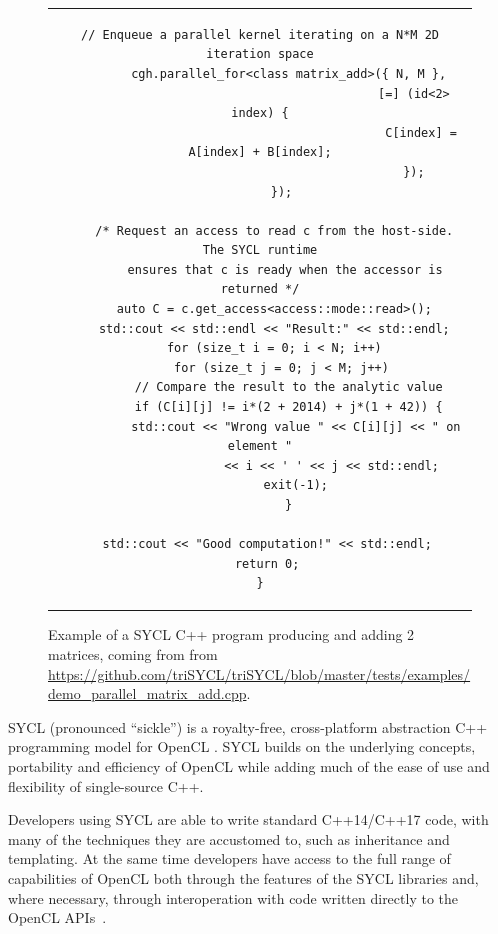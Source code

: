 \documentclass[sigplan, review]{acmart}
\begin{document}
\begin{figure}
\begin{tabular}{c}
\begin{lstlisting}[basicstyle=\scriptsize]
        // Enqueue a parallel kernel iterating on a N*M 2D iteration space
        cgh.parallel_for<class matrix_add>({ N, M },
                                           [=] (id<2> index) {
                                             C[index] = A[index] + B[index];
                                           });
      });

    /* Request an access to read c from the host-side. The SYCL runtime
       ensures that c is ready when the accessor is returned */
    auto C = c.get_access<access::mode::read>();
    std::cout << std::endl << "Result:" << std::endl;
    for (size_t i = 0; i < N; i++)
      for (size_t j = 0; j < M; j++)
        // Compare the result to the analytic value
        if (C[i][j] != i*(2 + 2014) + j*(1 + 42)) {
          std::cout << "Wrong value " << C[i][j] << " on element "
                    << i << ' ' << j << std::endl;
          exit(-1);
        }

  std::cout << "Good computation!" << std::endl;
  return 0;
}
    \end{lstlisting}
  \end{tabular}
  \caption{Example of a SYCL C++ program producing and adding 2
    matrices, coming from from
    \url{https://github.com/triSYCL/triSYCL/blob/master/tests/examples/demo_parallel_matrix_add.cpp}.\label{fig:SYCL-example}}
\end{figure}

SYCL \cite{SYCL-1.2,SYCL-2.2-provisional} (pronounced ``sickle'') is a
royalty-free, cross-platform abstraction C++ programming model for
OpenCL \cite{OpenCL-API-2.2-provisional,
  OpenCL-C++-2.2-provisional}. SYCL builds on the underlying concepts,
portability and efficiency of OpenCL while adding much of the ease of
use and flexibility of single-source C++.

Developers using SYCL are able to write standard C++14/C++17 code,
with many of the techniques they are accustomed to, such as
inheritance and templating. At the same time developers have access to
the full range of capabilities of OpenCL both through the features of
the SYCL libraries and, where necessary, through interoperation with
code written directly to the OpenCL
APIs~\cite{OpenCL-API-2.2-provisional}.
\end{document}
